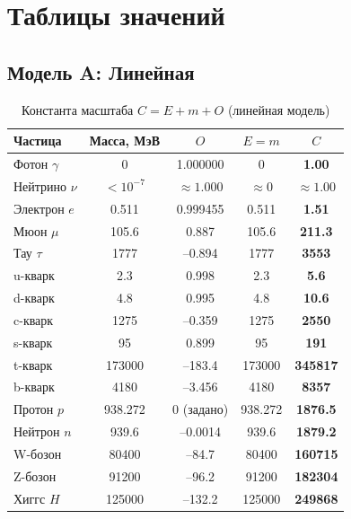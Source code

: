 \documentclass[12pt,a4paper]{article}
\begin{document}
\section{Таблицы значений}

\subsection{Модель A: Линейная}

\begin{table}[h]
    \centering
    \caption{Константа масштаба $C = E + m + O$ (линейная модель)}
    \begin{tabular}{lcccc}
        \toprule
        Частица & Масса, МэВ & $O$ & $E=m$ & $C$ \\
        \midrule
        Фотон $\gamma$ & 0 & 1.000000 & 0 & \textbf{1.00} \\
        Нейтрино $\nu$ & $<10^{-7}$ & $\approx 1.000$ & $\approx 0$ & $\approx 1.00$ \\
        Электрон $e$ & 0.511 & 0.999455 & 0.511 & \textbf{1.51} \\
        Мюон $\mu$ & 105.6 & 0.887 & 105.6 & \textbf{211.3} \\
        Тау $\tau$ & 1777 & --0.894 & 1777 & \textbf{3553} \\
        u-кварк & 2.3 & 0.998 & 2.3 & \textbf{5.6} \\
        d-кварк & 4.8 & 0.995 & 4.8 & \textbf{10.6} \\
        c-кварк & 1275 & --0.359 & 1275 & \textbf{2550} \\
        s-кварк & 95 & 0.899 & 95 & \textbf{191} \\
        t-кварк & 173000 & --183.4 & 173000 & \textbf{345817} \\
        b-кварк & 4180 & --3.456 & 4180 & \textbf{8357} \\
        Протон $p$ & 938.272 & 0 (задано) & 938.272 & \textbf{1876.5} \\
        Нейтрон $n$ & 939.6 & --0.0014 & 939.6 & \textbf{1879.2} \\
        W-бозон & 80400 & --84.7 & 80400 & \textbf{160715} \\
        Z-бозон & 91200 & --96.2 & 91200 & \textbf{182304} \\
        Хиггс $H$ & 125000 & --132.2 & 125000 & \textbf{249868} \\
        \bottomrule
    \end{tabular}
    \label{tab:modelA}
\end{table}
\end{document}
